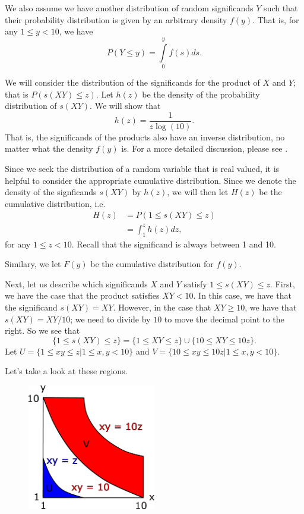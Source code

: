 We also assume we have another distribution of random significands \(Y\) such that their probability distribution is given by an 
arbitrary density \(f(y)\). That is, for any \(1 \leq y < 10\), we have 
\begin{equation}
P\left(Y \leq y\right) = \int \limits_0^y f(s) ds.
\end{equation}

We will consider the distribution of the significands for the product of \(X\) and \(Y\); that is \(P(s(XY) \leq z)\). Let \(h(z)\) be the density of the probability
distribution of \(s(XY)\). We will show that
\begin{equation}
h(z) = \frac{1}{z\log(10)}.
\end{equation}
That is, the significands of the products also have an inverse distribution, no matter what the density \(f(y)\) is. For a more detailed discussion, please see \cite{Hamming}.

Since we seek the distribution of a random variable that is real valued, it is helpful to consider the appropriate cumulative distribution. Since we denote the density of 
the signficands \(s(XY)\) by \(h(z)\), we will then let \(H(z)\) be the cumulative distribution, i.e. 
\begin{align}
H(z) & = P(1 \leq s(XY) \leq z) \\
    & = \int_1^z h(z) dz,
\end{align}
for any \(1 \leq z < 10\). Recall that the significand is always between 1 and 10.

Similary, we let \(F(y)\) be the cumulative distribution for \(f(y)\).

Next, let us describe which significands \(X\) and \(Y\) satisfy \(1 \leq s(XY) \leq z\). First, we have the case that the product satisfies \(XY < 10\). In this case, we have that
the significand \(s(XY) = XY\). However, in the case that \(XY \geq 10\), we have that \(s(XY) = XY / 10\); we need to divide by \(10\) to move the decimal point to the right. So we
see that
\begin{equation}
\{1 \leq s(XY) \leq z\} = \{1 \leq XY \leq z\} \cup \{10 \leq XY \leq 10z\}.
\end{equation}
Let \(U = \{1 \leq xy \leq z | 1\leq x,y < 10\}\) and \(V = \{10 \leq xy \leq 10z | 1\leq x, y < 10\}\).

Let's take a look at these regions.

\begin{figure}[h]
\centering
\includegraphics[width = 0.5\textwidth]{multiVarIntCalc/significandProduct.pdf}
\end{figure}

